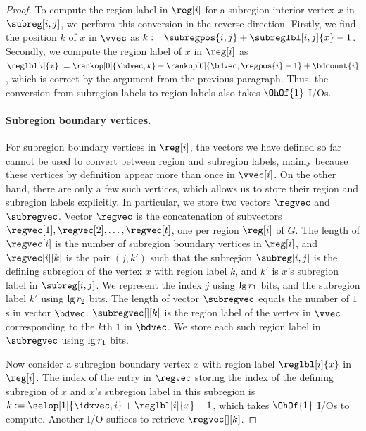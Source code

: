 {\begin{proof}
  To compute the region label in $\reg[i]$ for a subregion-interior
  vertex $x$ in $\subreg[i,j]$, we perform this conversion in the reverse
  direction.
  Firstly, we find the position $k$ of $x$ in $\vvec$ as
  $k := \subregpos{i,j} + \subreglbl[i,j]{x} - 1$.
  Secondly, we compute the region label of $x$ in $\reg[i]$ as
  $\reglbl[i]{x} := \rankop[0]{\bdvec,k} - \rankop[0]{\bdvec,\regpos{i}-1} + \bdcount{i}$,
  which is correct by the argument from the previous paragraph.
  Thus, the conversion from subregion labels to region labels also takes
  $\OhOf{1}$ I/Os.

  \paragraph{Subregion boundary vertices.}

  For subregion boundary vertices in $\reg[i]$, the vectors we have defined so
  far cannot be used to convert between region and subregion labels, mainly
  because these vertices by definition appear more than once in $\vvec[i]$.
  On the other hand, there are only a few such vertices, which allows us to
  store their region and subregion labels explicitly.
  In particular, we store two vectors $\regvec$ and~$\subregvec$.
  Vector $\regvec$ is the concatenation of subvectors $\regvec[1], \regvec[2],
  \dots, \regvec[t]$, one per region $\reg[i]$ of $G$.
  The length of $\regvec[i]$ is the number of subregion boundary vertices
  in $\reg[i]$, and $\regvec[i][k]$ is the pair $(j,k')$ such that the
  subregion $\subreg[i,j]$ is the defining subregion of the vertex $x$
  with region label $k$, and $k'$ is $x$'s subregion label in $\subreg[i,j]$.
  We represent the index $j$ using $\lg r_1$ bits, and the subregion
  label $k'$ using $\lg r_2$ bits.
  The length of vector $\subregvec$ equals the number of $1$s in vector
  $\bdvec$.
  $\subregvec[][k]$ is the region label of the vertex in $\vvec$ corresponding
  to the $k$th $1$ in $\bdvec$.
  We store each such region label in $\subregvec$ using $\lg r_1$ bits.

  Now consider a subregion boundary vertex $x$ with region label
  $\reglbl[i]{x}$ in $\reg[i]$.
  The index of the entry in $\regvec$ storing the index of the defining
  subregion of $x$ and $x$'s subregion label in this subregion is 
  $k := \selop[1]{\idxvec,i} + \reglbl[i]{x} - 1$, which takes
  $\OhOf{1}$ I/Os to compute.
  Another I/O suffices to retrieve $\regvec[][k]$.


\end{proof}}

